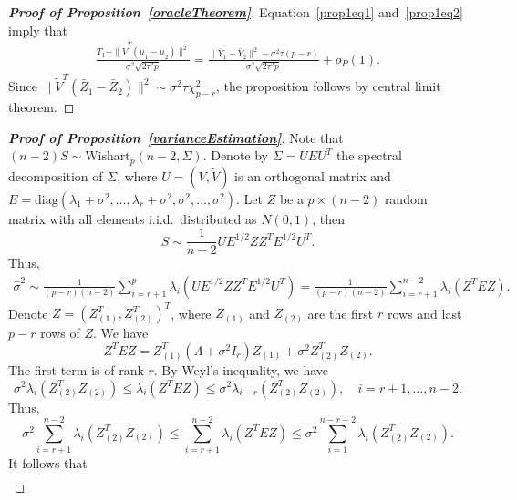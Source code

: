 \documentclass[review]{elsarticle}
\theoremstyle{plain}
\theoremstyle{definition}
\theoremstyle{remark}
\begin{document}
\begin{proof}[\textbf{Proof of Proposition~\ref{oracleTheorem}}]
    Equation~\eqref{prop1eq1} and~\eqref{prop1eq2} imply that
    \begin{equation}
        \begin{aligned}
            \frac{T_1-\|\tilde{V}^T(\mu_1-\mu_2)\|^2}{\sigma^2\sqrt{2\tau^2 p}}
            =
            \frac{\|\bar{Y}_1-\bar{Y}_2\|^2-
                \sigma^2 \tau (p-r)}{\sigma^2\sqrt{2\tau^2 p}}
                +o_P(1).
        \end{aligned}
    \end{equation}
    Since
$\|\tilde{V}^T(\bar{Z}_1-\bar{Z}_2)\|^2\sim \sigma^2\tau\chi^2_{p-r}$,
the proposition follows by central limit theorem.
\end{proof}



\begin{proof}[\textbf{Proof of Proposition~\ref{varianceEstimation}}]
    Note that $(n-2)S\sim \mathrm{Wishart}_p (n-2,\Sigma)$.
    Denote by $\Sigma=UEU^T$ the spectral decomposition of $\Sigma$, where $U=(V,\tilde{V})$ is an orthogonal matrix and $E=\mathrm{diag}(\lambda_1+\sigma^2,\ldots,\lambda_r+\sigma^2,\sigma^2,\ldots,\sigma^2)$.
    Let $Z$ be a $p\times (n-2)$ random matrix with all elements i.i.d.\ distributed as $N(0,1)$, then
    $$
        S\sim \frac{1}{n-2} U E^{1/2} Z Z^T E^{1/2} U^T.
    $$
    Thus,
    \begin{equation*}
        \begin{aligned}
            \hat{\sigma}^2\sim
            \frac{1}{(p-r)(n-2)}\sum_{i=r+1}^p \lambda_i (U E^{1/2} Z Z^T E^{1/2} U^T)
            =
            \frac{1}{(p-r)(n-2)}\sum_{i=r+1}^{n-2} \lambda_i ( Z^T E Z).
        \end{aligned}
    \end{equation*}
    Denote $Z={(Z_{(1)}^T,Z_{(2)}^T)}^T$, where $Z_{(1)}$ and $Z_{(2)}$ are the first $r$ rows and last $p-r$ rows of $Z$. We have
    $$
    Z^T E Z =Z_{(1)}^T (\Lambda +\sigma^2 I_r) Z_{(1)}+\sigma^2 Z_{(2)}^T Z_{(2)}.
    $$
 The first term is of rank $r$. By Weyl's inequality, we have
    $$
    \sigma^2\lambda_i(Z_{(2)}^T Z_{(2)}) \leq \lambda_i(Z^T E Z)\leq
    \sigma^2\lambda_{i-r}(Z_{(2)}^T Z_{(2)}),
    \quad
    \textrm{$i=r+1,\ldots, n-2$}.
    $$
    Thus,
    $$
    \sigma^2\sum_{i=r+1}^{n-2}\lambda_i(Z_{(2)}^T Z_{(2)}) \leq \sum_{i=r+1}^{n-2}\lambda_i(Z^T E Z)\leq
    \sigma^2\sum_{i=1}^{n-r-2}\lambda_{i}(Z_{(2)}^T Z_{(2)}).
    $$
     It follows that
     \begin{equation*}
         \begin{aligned}

\end{aligned}
\end{equation*}
\end{proof}
\end{document}
